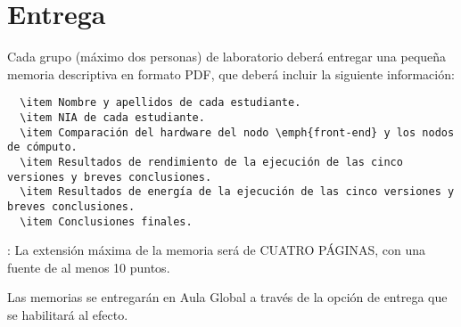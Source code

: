 \section{Entrega}

Cada grupo (máximo dos personas) de laboratorio deberá entregar una pequeña memoria
descriptiva en formato PDF, que deberá incluir la siguiente información:

\begin{lstlisting}
  \item Nombre y apellidos de cada estudiante.
  \item NIA de cada estudiante.
  \item Comparación del hardware del nodo \emph{front-end} y los nodos de cómputo.
  \item Resultados de rendimiento de la ejecución de las cinco versiones y breves conclusiones.
  \item Resultados de energía de la ejecución de las cinco versiones y breves conclusiones.
  \item Conclusiones finales.
\end{lstlisting}

: La extensión máxima de la memoria será de CUATRO PÁGINAS,
                      con una fuente de al menos 10 puntos.

Las memorias se entregarán en Aula Global a través de la opción de entrega que se 
habilitará al efecto.
